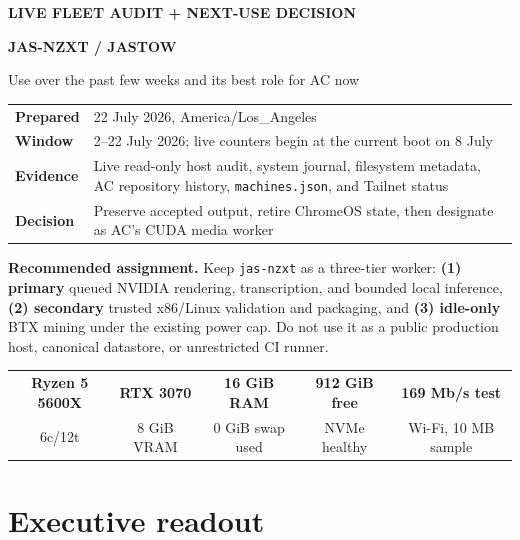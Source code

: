 \documentclass[11pt,letterpaper]{article}
\newcommand{\mono}[1]{\texttt{#1}}
\begin{document}
\vspace*{0.12in}
{\small\bfseries\color{ACPink}LIVE FLEET AUDIT + NEXT-USE DECISION}\par
\vspace{4pt}
{\fontsize{25}{29}\selectfont\bfseries\color{Ink}JAS-NZXT / JASTOW}\par
{\fontsize{16}{20}\selectfont\color{Muted}Use over the past few weeks and its best role for AC now}\par
\vspace{12pt}

\begin{tabularx}{\textwidth}{@{}L{0.92in}Y@{}}
\textbf{Prepared} & 22 July 2026, America/Los\_Angeles \\
\textbf{Window} & 2--22 July 2026; live counters begin at the current boot on 8 July \\
\textbf{Evidence} & Live read-only host audit, system journal, filesystem metadata, AC repository history, \mono{machines.json}, and Tailnet status \\
\textbf{Decision} & Preserve accepted output, retire ChromeOS state, then designate as AC's CUDA media worker \\
\end{tabularx}

\vspace{10pt}
\begin{decisionbox}
\textbf{Recommended assignment.} Keep \mono{jas-nzxt} as a three-tier worker:
\textbf{(1) primary} queued NVIDIA rendering, transcription, and bounded local inference,
\textbf{(2) secondary} trusted x86/Linux validation and packaging, and
\textbf{(3) idle-only} BTX mining under the existing power cap. Do not use it as a public production host, canonical datastore, or unrestricted CI runner.
\end{decisionbox}

\begin{center}
\begin{tabular}{@{}ccccc@{}}
\textbf{Ryzen 5 5600X} & \textbf{RTX 3070} & \textbf{16 GiB RAM} & \textbf{912 GiB free} & \textbf{169 Mb/s test} \\
\small 6c/12t & \small 8 GiB VRAM & \small 0 GiB swap used & \small NVMe healthy & \small Wi-Fi, 10 MB sample \\
\end{tabular}
\end{center}

\section{Executive readout}
\end{document}
